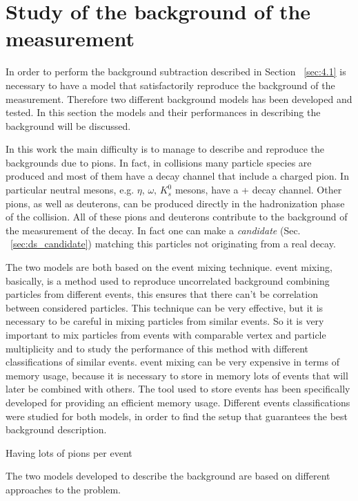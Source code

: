 %
%
\section{Study of the background of the measurement} \label{sec:background}

In order to perform the background subtraction described in Section ~\ref{sec:4.1} is necessary to have
a model that satisfactorily reproduce the background of the measurement. 
Therefore two different background models has been developed and tested. 
In this section the models and their performances in describing the background will be discussed.

In this work the main difficulty is to manage to describe and reproduce the backgrounds due to pions.
In fact, in \pPb collisions many particle species are produced \cite{pkp_prod, neutralp, k0s_prod} 
and most of them have a decay channel that include a charged pion.
In particular neutral mesons, e.g. $\eta,\,\omega,\,K_{s}^{0}$ mesons, have a 
\pip + \pim decay channel. Other pions, as well as deuterons, can be produced directly
in the hadronization phase of the collision.
All of these pions and deuterons contribute to the background of the measurement of the
\dstdecay decay. In fact one can make a \textit{\ds candidate} (Sec. ~\ref{sec:ds_candidate})
matching this particles not originating from a real \ds decay.

The two models are both based on the event mixing technique.
event mixing, basically, is a method used to reproduce uncorrelated background combining particles from
different events, this ensures that there can’t be correlation between considered particles.
This technique can be very effective, but it is necessary to be careful in mixing particles from 
similar events.
So it is very important to mix particles from events with comparable vertex and particle multiplicity 
and to study the performance of this method with different classifications of similar events.
event mixing can be very expensive in terms of memory usage, because it is necessary to store in memory
lots of events that will later be combined with others.
The tool used to store events has been specifically developed for providing an efficient memory usage.
Different events classifications were studied for both models, in order to find the setup that 
guarantees the best background description.




Having lots of pions per event

The two models developed to describe the \dsdecay background are based on different approaches to the
problem.






